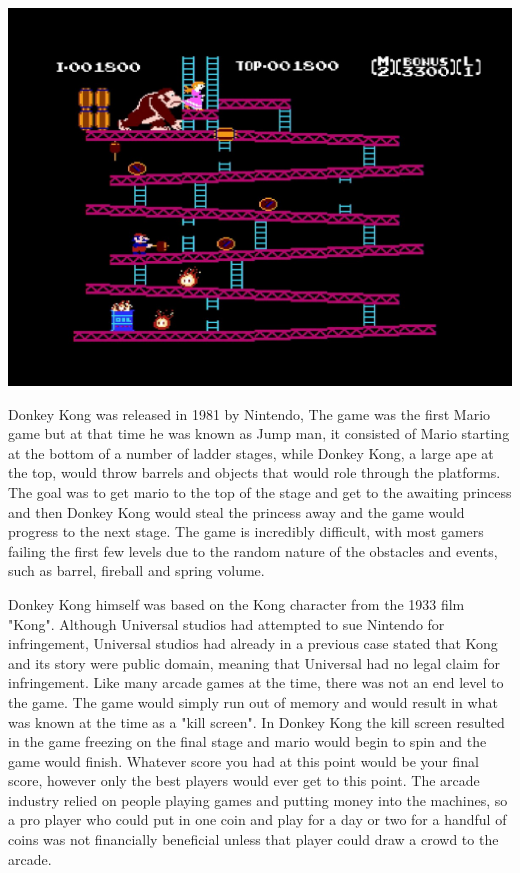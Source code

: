 \documentclass{article}
\begin{document}
\begin{minipage}{0.4\textwidth}
\includegraphics[width=\linewidth]{donkeykong}
\end{minipage} \hfill
\begin{minipage}{0.55\textwidth}\raggedright
Donkey Kong was released in 1981 by Nintendo, The game was the first Mario game but at that time he was known as Jump man, it consisted of Mario starting at the bottom of a number of ladder stages, while Donkey Kong, a large ape at the top, would throw barrels and objects that would role through the platforms. The goal was to get mario to the top of the stage and get to the awaiting princess and then Donkey Kong would steal the princess away and the game would progress to the next stage. The game is incredibly difficult, with most gamers failing the first few levels due to the random nature of the obstacles and events, such as barrel, fireball and spring volume.
\end{minipage} \newline

Donkey Kong himself was based on the Kong character from the 1933 film "Kong". Although Universal studios had attempted to sue Nintendo for infringement, Universal studios had already in a previous case stated that Kong and its story were public domain, meaning that Universal had no legal claim for infringement. Like many arcade games at the time, there was not an end level to the game. The game would simply run out of memory and would result in what was known at the time as a "kill screen". In Donkey Kong the kill screen resulted in the game freezing on the final stage and mario would begin to spin and the game would finish. Whatever score you had at this point would be your final score, however only the best players would ever get to this point. The arcade industry relied on people playing games and putting money into the machines, so a pro player who could put in one coin and play for a day or two for a handful of coins was not financially beneficial unless that player could draw a crowd to the arcade. \newline 
\end{document}
